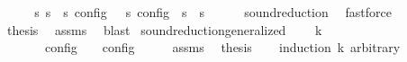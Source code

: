 \begin{isabellebody}
\ {\isacharminus}\isanewline
\ \ \isamarkupfalse%
\ {\isacartoucheopen}{\isasymforall}s\ s\ {\isacharparenleft}{\isasymlbrakk}\ s\ {\isasymrbrakk}\isactrlsub c\isactrlsub o\isactrlsub n\isactrlsub f\isactrlsub i\isactrlsub g\ {\isasymsubseteq}\ {\isasymlbrakk}\ s\ {\isasymrbrakk}\isactrlsub c\isactrlsub o\isactrlsub n\isactrlsub f\isactrlsub i\isactrlsub g{\isacharparenright}\ {\isasymor}\ {\isasymnot}{\isacharparenleft}s\ {\isasymhookrightarrow}\ s\isanewline
\ \ \ \ \isamarkupfalse%
\ sound{\isacharunderscore}reduction\ \isamarkupfalse%
\ fastforce\isanewline
\ \ \isamarkupfalse%
\ {\isacharquery}thesis\ \isamarkupfalse%
\ assms\ \isamarkupfalse%
\ blast\isanewline
{}\isamarkupfalse%
%
\endisatagproof
{\isafoldproof}%
%
\isadelimproof
\isanewline
%
\endisadelimproof
\isanewline
{}\isamarkupfalse%
\ sound{\isacharunderscore}reduction{\isacharunderscore}generalized{\isacharcolon}\isanewline
\ \ \ {\isacartoucheopen}{\isasymS}\ {\isasymhookrightarrow}\isactrlbsup k\isactrlesup \ {\isasymS}\isanewline
\ \ \ \ \ {\isacartoucheopen}{\isasymlbrakk}\ {\isasymS}\ {\isasymrbrakk}\isactrlsub c\isactrlsub o\isactrlsub n\isactrlsub f\isactrlsub i\isactrlsub g\ {\isasymsupseteq}\ {\isasymlbrakk}\ {\isasymS}\ {\isasymrbrakk}\isactrlsub c\isactrlsub o\isactrlsub n\isactrlsub f\isactrlsub i\isactrlsub g{\isacartoucheclose}\isanewline
%
\isadelimproof
%
\endisadelimproof
%
\isatagproof
{}\isamarkupfalse%
\ {\isacharminus}\isanewline
\ \ \isamarkupfalse%
\ assms\ \isamarkupfalse%
\ {\isacharquery}thesis\isanewline
\ \ \isamarkupfalse%
\ {\isacharparenleft}induction\ k\ arbitrary{\isacharcolon}\ {\isasymS}\isanewline
\ \ \ \ \isamarkupfalse%
\ {}\isanewline
\ \ \ \ \ \ \isamarkupfalse%
\ {\isacharasterisk}{\isacharcolon}\ {\isacartoucheopen}{\isasymS}\ {\isasymhookrightarrow}\isactrlesup \ {\isasymS}\ {\isasymLongrightarrow}\ {\isasymS}\ {\isacharequal}\ {\isasymS}\ \isamarkupfalse%

\end{isabellebody}
